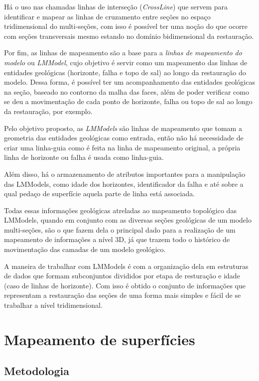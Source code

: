 Há o uso nas chamadas linhas de interseção (\textit{CrossLine}) que servem para identificar e mapear as linhas de cruzamento entre seções no espaço tridimensional do multi-seções, com isso é possível ter uma noção do que ocorre com seções transversais mesmo estando no domínio bidimensional da restauração.

Por fim, as linhas de mapeamento são a base para a \textit{linhas de mapeamento do modelo} ou \textit{LMModel}, cujo objetivo é servir como um mapeamento das linhas de entidades geológicas (horizonte, falha e topo de sal) ao longo da restauração do modelo. Dessa forma, é possível ter um acompanhamento das entidades geológicas na seção, baseado no contorno da malha das faces, além de poder verificar como se deu a movimentação de cada ponto de horizonte, falha ou topo de sal ao longo da restauração, por exemplo.

Pelo objetivo proposto, as \textit{LMModels} são linhas de mapeamento que tomam a geometria das entidades geológicas como entrada, então não há necessidade de criar uma linha-guia como é feita na linha de mapeamento original, a própria linha de horizonte ou falha é usada como linha-guia.

Além disso, há o armazenamento de atributos importantes para a manipulação das LMModels, como idade dos horizontes, identificador da falha e até sobre a qual pedaço de superfície aquela parte de linha está associada.

Todas essas informações  geológicas atreladas ao mapeamento topológico das LMModels, quando em conjunto com as diversas seções geológicas de um modelo multi-seções, são o que fazem dela o principal dado para a realização de um mapeamento de informações a nível 3D, já que trazem todo o histórico de movimentação das camadas de um modelo geológico.

A maneira de trabalhar com LMModels é com a organização dela em estruturas de dados que formam subconjuntos divididos por etapa de resturação e idade (caso de linhas de horizonte). Com isso é obtido o conjunto de informações que representam a restauração das seções de uma forma mais simples e fácil de se trabalhar a nível tridimensional.

\section{Mapeamento de superfícies}

\subsection{Metodologia}

